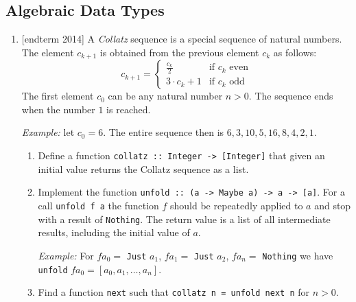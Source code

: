 \documentclass{article}
\begin{document}
\subsection{Algebraic Data Types}
\begin{enumerate}
    \item {[endterm 2014]} A \textit{Collatz} sequence is a special sequence of natural numbers. The element $c_{k+1}$ is obtained from the previous element $c_k$ as follows:
    \[
    c_{k+1} =
    \begin{cases}
      \frac{c_k}{2} & \text{if $c_k$ even} \\
      3 \cdot c_k + 1 & \text{if $c_k$ odd}
    \end{cases}
    \]
    The first element $c_0$ can be any natural number $n > 0$. The sequence ends when the number $1$ is reached. \par
    \textit{Example:} let $c_0 = 6$. The entire sequence then is $6,3,10,5,16,8,4,2,1$.
    \begin{enumerate}
    \item Define a function \verb|collatz :: Integer -> [Integer]| that given an initial value returns the Collatz sequence as a list.
    \item Implement the function \verb|unfold :: (a -> Maybe a) -> a -> [a]|. For a call \verb|unfold f a| the function $f$ should be repeatedly applied to $a$ and stop with a result of \verb|Nothing|. The return value is a list of all intermediate results, including the initial value of $a$. \par
    \textit{Example:} For $f a_0 =$ \verb|Just| $a_1$, $f a_1 =$ \verb|Just| $a_2$, $f a_n =$ \verb|Nothing| we have \verb|unfold| $f a_0 = [a_0, a_1, \dots, a_n]$.
    \item Find a function \verb|next| such that \verb|collatz n = unfold next n| for $n > 0$.
    \end{enumerate}


\end{enumerate}
\end{document}
